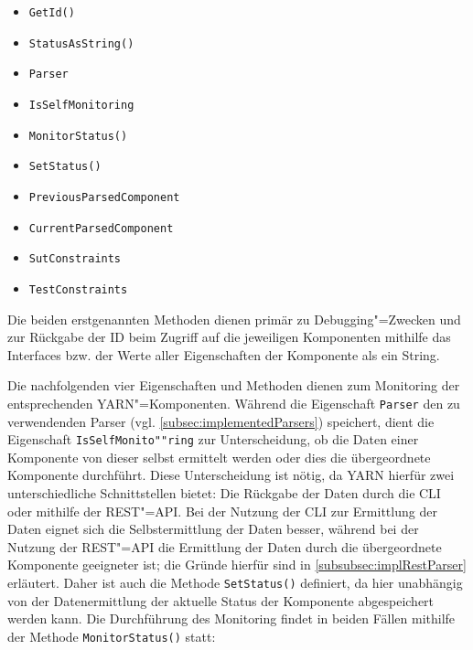 \begin{itemize}
    \item \texttt{GetId()}
    \item \texttt{StatusAsString()}
    
    \item \texttt{Parser}
    \item \texttt{IsSelfMonitoring}
    \item \texttt{MonitorStatus()}
    \item \texttt{SetStatus()}
    
    \item \texttt{PreviousParsedComponent}
    \item \texttt{CurrentParsedComponent}
    \item \texttt{SutConstraints}
    \item \texttt{TestConstraints}
\end{itemize}

Die beiden erstgenannten Methoden dienen primär zu Debugging"=Zwecken und zur Rückgabe der ID beim Zugriff auf die jeweiligen Komponenten mithilfe das Interfaces bzw. der Werte aller Eigenschaften der Komponente als ein String.

Die nachfolgenden vier Eigenschaften und Methoden dienen zum Monitoring der entsprechenden YARN"=Komponenten.
Während die Eigenschaft \texttt{Parser} den zu verwendenden Parser (vgl. \cref{subsec:implementedParsers}) speichert, dient die Eigenschaft \texttt{IsSelfMonito""ring} zur Unterscheidung, ob die Daten einer Komponente von dieser selbst ermittelt werden oder dies die übergeordnete Komponente durchführt.
Diese Unterscheidung ist nötig, da YARN hierfür zwei unterschiedliche Schnittstellen bietet: Die Rückgabe der Daten durch die \gls{CLI} oder mithilfe der REST"=API.
Bei der Nutzung der \gls{CLI} zur Ermittlung der Daten eignet sich die Selbstermittlung der Daten besser, während bei der Nutzung der REST"=API die Ermittlung der Daten durch die übergeordnete Komponente geeigneter ist; die Gründe hierfür sind in \cref{subsubsec:implRestParser} erläutert.
Daher ist auch die Methode \texttt{SetStatus()} definiert, da hier unabhängig von der Datenermittlung der aktuelle Status der Komponente abgespeichert werden kann.
Die Durchführung des Monitoring findet in beiden Fällen mithilfe der Methode \texttt{MonitorStatus()} statt:

